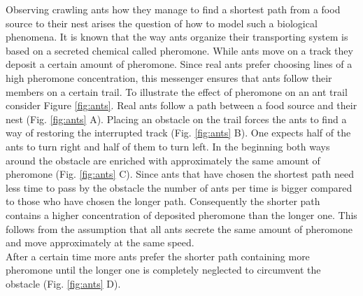 
Observing crawling ants how they manage to find a shortest path from a food source to their nest arises the question of how to model such a biological phenomena. It is known that the way ants organize their transporting system is based on a secreted chemical called pheromone. While ants move on a track they deposit a certain amount of pheromone. Since real ants prefer choosing lines of a high pheromone concentration, this messenger ensures that ants follow their members on a certain trail.
To illustrate the effect of pheromone on an ant trail consider Figure \ref{fig:ants}. Real ants follow a path between a food source and their nest (Fig. \ref{fig:ants} A). Placing an obstacle on the trail forces the ants to find a way of restoring the interrupted track (Fig. \ref{fig:ants} B). One expects half of the ants to turn right and half of them to turn left. In the beginning both ways around the obstacle are enriched with approximately the same amount of pheromone (Fig. \ref{fig:ants} C). Since ants that have chosen the shortest path need less time to pass by the obstacle the number of ants per time is bigger compared to those who have chosen the longer path. Consequently the shorter path contains a higher concentration of deposited pheromone than the longer one. This follows from the assumption that all ants secrete the same amount of pheromone and move approximately at the same speed. \\
After a certain time more ants prefer the shorter path containing more pheromone until the longer one is completely neglected to circumvent the obstacle (Fig. \ref{fig:ants} D).\\


